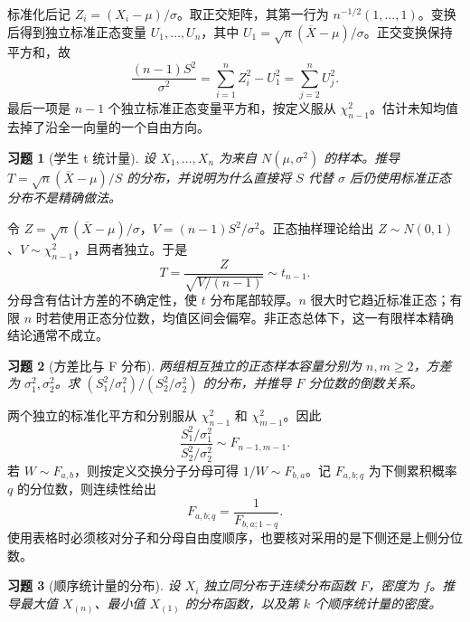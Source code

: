 \documentclass[12pt,fontset=fandol]{ctexart}
\newtheorem{exercise}{习题}[section]
\begin{document}
\begin{solve}\label{a:B8.4}标准化后记 $Z_i=(X_i-\mu)/\sigma$。取正交矩阵，其第一行为 $n^{-1/2}(1,\ldots,1)$。变换后得到独立标准正态变量 $U_1,\ldots,U_n$，其中 $U_1=\sqrt n(\overline X-\mu)/\sigma$。正交变换保持平方和，故\[\frac{(n-1)S^2}{\sigma^2}=\sum_{i=1}^nZ_i^2-U_1^2=\sum_{j=2}^nU_j^2.\]最后一项是 $n-1$ 个独立标准正态变量平方和，按定义服从 $\chi^2_{n-1}$。估计未知均值去掉了沿全一向量的一个自由方向。\end{solve}

\begin{exercise}[学生 t 统计量]\label{q:B8.5}
设 $X_1,\ldots,X_n$ 为来自 $N(\mu,\sigma^2)$ 的样本。推导 $T=\sqrt n(\overline X-\mu)/S$ 的分布，并说明为什么直接将 $S$ 代替 $\sigma$ 后仍使用标准正态分布不是精确做法。\par{}
\end{exercise}

\begin{solve}\label{a:B8.5}令 $Z=\sqrt n(\overline X-\mu)/\sigma$，$V=(n-1)S^2/\sigma^2$。正态抽样理论给出 $Z\sim N(0,1)$、$V\sim\chi^2_{n-1}$，且两者独立。于是\[T=\frac{Z}{\sqrt{V/(n-1)}}\sim t_{n-1}.\]分母含有估计方差的不确定性，使 $t$ 分布尾部较厚。$n$ 很大时它趋近标准正态；有限 $n$ 时若使用正态分位数，均值区间会偏窄。非正态总体下，这一有限样本精确结论通常不成立。\end{solve}

\begin{exercise}[方差比与 F 分布]\label{q:B8.6}
两组相互独立的正态样本容量分别为 $n,m\ge2$，方差为 $\sigma_1^2,\sigma_2^2$。求 $(S_1^2/\sigma_1^2)/(S_2^2/\sigma_2^2)$ 的分布，并推导 $F$ 分位数的倒数关系。\par{}
\end{exercise}

\begin{solve}\label{a:B8.6}两个独立的标准化平方和分别服从 $\chi^2_{n-1}$ 和 $\chi^2_{m-1}$。因此\[\frac{S_1^2/\sigma_1^2}{S_2^2/\sigma_2^2}\sim F_{n-1,m-1}.\]若 $W\sim F_{a,b}$，则按定义交换分子分母可得 $1/W\sim F_{b,a}$。记 $F_{a,b;q}$ 为下侧累积概率 $q$ 的分位数，则连续性给出\[F_{a,b;q}=\frac{1}{F_{b,a;1-q}}.\]使用表格时必须核对分子和分母自由度顺序，也要核对采用的是下侧还是上侧分位数。\end{solve}

\begin{exercise}[顺序统计量的分布]\label{q:B8.7}
设 $X_i$ 独立同分布于连续分布函数 $F$，密度为 $f$。推导最大值 $X_{(n)}$、最小值 $X_{(1)}$ 的分布函数，以及第 $k$ 个顺序统计量的密度。\par{}
\end{exercise}
\end{document}
